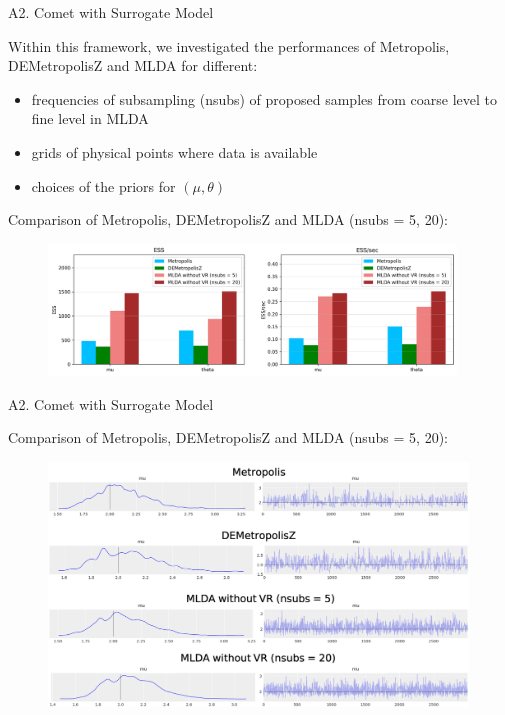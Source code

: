 \documentclass[10pt, a4paper]{beamer}
\begin{document}
	\begin{frame}{A2. Comet with Surrogate Model}
		
		Within this framework, we investigated the performances of Metropolis, DEMetropolisZ and MLDA for different:
		
		\begin{itemize}
			
			\item frequencies of subsampling (nsubs) of proposed samples from coarse level to fine level in MLDA
			\item grids of physical points where data is available
			\item choices of the priors for $(\mu,\theta)$
			
		\end{itemize}
		
		\vspace{0.5\baselineskip}
	
		Comparison of Metropolis, DEMetropolisZ and MLDA (nsubs = 5, 20):
	
		\begin{figure}[H]
			\includegraphics[height = 3.5cm]{A2_ESS_Comparison}
		\end{figure}
		
	\end{frame}

	\begin{frame}{A2. Comet with Surrogate Model}
		
		Comparison of Metropolis, DEMetropolisZ and MLDA (nsubs = 5, 20):

		\begin{figure}[H]
			\includegraphics[height = 6.5cm]{A2_Traceplots}
		\end{figure}

	\end{frame}
	
\end{document}
